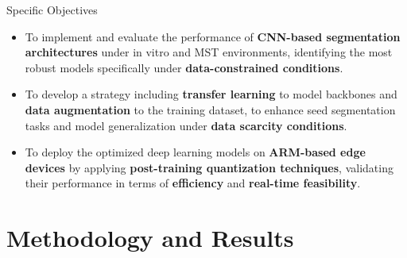 \documentclass[aspectratio=169]{beamer}
\begin{document}
\begin{frame}{Specific Objectives}
\centering
\begin{itemize}
    \setlength\itemsep{2em}
    \item[1] To implement and evaluate the performance of \textbf{CNN-based segmentation architectures} under in vitro and MST environments, identifying the most robust models specifically under \textbf{data-constrained conditions}.
 
    \item[2] To develop a strategy including  \textbf{transfer learning} to model backbones and \textbf{data augmentation} to the training dataset, to enhance seed segmentation tasks and model generalization under \textbf{data scarcity conditions}.
 
    \item[3] To deploy the optimized deep learning models on \textbf{ARM-based edge devices} by applying \textbf{post-training quantization techniques}, validating their performance in terms of \textbf{efficiency} and \textbf{real-time feasibility}.
\end{itemize}
\end{frame}

\section{Methodology and Results}
\end{document}
